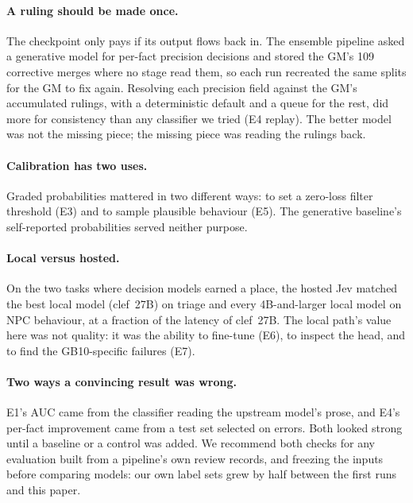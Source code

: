 \documentclass[11pt]{article}
\begin{document}
\paragraph{A ruling should be made once.} The checkpoint only pays if its output flows back in. The
ensemble pipeline asked a generative model for per-fact precision decisions and stored the GM's 109
corrective merges where no stage read them, so each run recreated the same splits for the GM to fix
again. Resolving each precision field against the GM's accumulated rulings, with a deterministic
default and a queue for the rest, did more for consistency than any classifier we tried (E4 replay).
The better model was not the missing piece; the missing piece was reading the rulings back.

\paragraph{Calibration has two uses.} Graded probabilities mattered in two different ways: to set a
zero-loss filter threshold (E3) and to sample plausible behaviour (E5). The generative baseline's
self-reported probabilities served neither purpose.

\paragraph{Local versus hosted.} On the two tasks where decision models earned a place, the hosted
Jev matched the best local model (clef~27B) on triage and every 4B-and-larger local model on NPC
behaviour, at a fraction of the latency of clef~27B. The local path's value here was not quality: it
was the ability to fine-tune (E6), to inspect the head, and to find the GB10-specific failures (E7).

\paragraph{Two ways a convincing result was wrong.} E1's AUC came from the classifier reading the
upstream model's prose, and E4's per-fact improvement came from a test set selected on errors. Both
looked strong until a baseline or a control was added. We recommend both checks for any evaluation
built from a pipeline's own review records, and freezing the inputs before comparing models: our
own label sets grew by half between the first runs and this paper.
\end{document}
